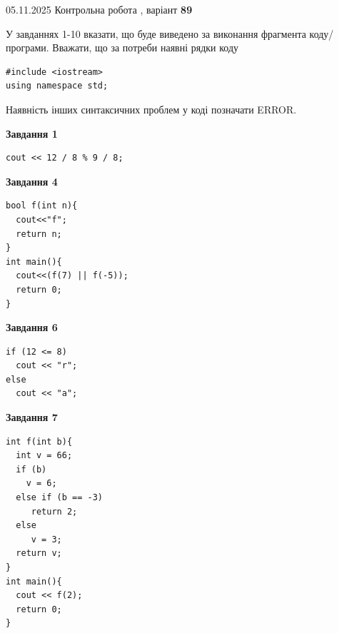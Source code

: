 \documentclass[12pt, ukrainian]{article}
\begin{document}
\newpage

{\Large{05.11.2025 Контрольна робота , варіант  \No \textbf { 89 }\par}}
{
\begin {large}
У завданнях 1-10 вказати, що буде виведено за виконання фрагмента коду/про\-гра\-ми.
Вважати, що за потреби наявні рядки коду
\begin{verbatim}
#include <iostream>
using namespace std;
\end{verbatim}
Наявність інших синтаксичних проблем у коді позначати ERROR.

\begin{minipage}[t]{7.0cm}

\begin{center}
\textbf{Завдання 1}
\end{center}
\vspace{-8mm}

\begin{verbatim}
cout << 12 / 8 % 9 / 8;
\end{verbatim}



\begin{center}
\textbf{Завдання 4}
\end{center}
\vspace{-8mm}

\begin{verbatim}
bool f(int n){
  cout<<"f";
  return n;
}
int main(){
  cout<<(f(7) || f(-5));
  return 0;
}
\end{verbatim}



\begin{center}
\textbf{Завдання 6}
\end{center}
\vspace{-8mm}

\begin{verbatim}
if (12 <= 8)
  cout << "r";
else
  cout << "a";
\end{verbatim}



\begin{center}
\textbf{Завдання 7}
\end{center}
\vspace{-8mm}

\begin{verbatim}
int f(int b){
  int v = 66;
  if (b)
    v = 6;
  else if (b == -3)
     return 2;
  else
     v = 3;
  return v;
}
int main(){
  cout << f(2);
  return 0;
}
\end{verbatim}


\end{minipage}
\end{large}}
\end{document}

